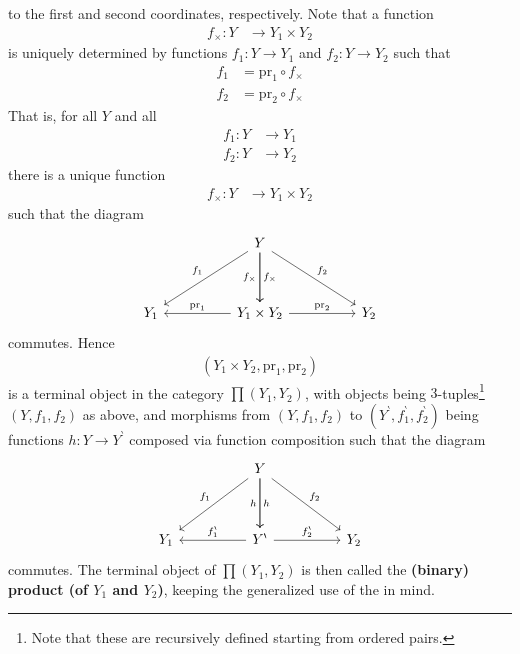 to the first and second coordinates, respectively.
Note that a function
\begin{align*}
  f_{\times}
  \colon
  Y
  &\rightarrow
  Y_{1}
  \times
  Y_{2}
\end{align*}
is uniquely determined by functions $f_{1} \colon Y \rightarrow Y_{1}$ and $f_{2} \colon Y \rightarrow Y_{2}$ such that
\begin{align*}
  f_{1}
  &=
  \mathrm{pr}_{1}
  \circ
  f_{\times}
  \\
  f_{2}
  &=
  \mathrm{pr}_{2}
  \circ
  f_{\times}
\end{align*}
That is, for all $Y$ and all
\begin{align*}
  f_{1}
  \colon
  Y
  &\rightarrow
  Y_{1}
  \\
  f_{2}
  \colon
  Y
  &\rightarrow
  Y_{2}
\end{align*}
there is a unique function
\begin{align*}
  f_{\times}
  \colon
  Y
  &\rightarrow
  Y_{1}
  \times
  Y_{2}
\end{align*}
such that the diagram
\[
\begin{tikzcd}[sep=huge]
  &
  Y
  \arrow{dr}{f_{2}}
  \arrow{d}{f_{\times}}
  \arrow[swap]{d}{f_{\times}}
  \arrow[swap]{dl}{f_{1}}
  &
  \\
  Y_{1}
  &
  Y_{1}
  \times
  Y_{2}
  \arrow{r}{\mathrm{pr}_{2}}
  \arrow[swap]{l}{\mathrm{pr}_{1}}
  &
  Y_{2}
\end{tikzcd}
\]
commutes.
Hence
\begin{align*}
  \left(
    Y_{1}
    \times
    Y_{2},
    \mathrm{pr}_{1},
    \mathrm{pr}_{2}
  \right)
\end{align*}
is a terminal object in the category $\pmb{\prod}(Y_{1},Y_{2})$, with objects being $3$-tuples\footnote{Note that these are recursively defined starting from ordered pairs.} $(Y,f_{1},f_{2})$ as above, and morphisms from $(Y,f_{1},f_{2})$ to $(Y^{\backprime},f_{1}^{\backprime},f_{2}^{\backprime})$ being functions $h \colon Y \rightarrow Y^{\backprime}$ composed via function composition such that the diagram
\[
\begin{tikzcd}[sep=huge]
  &
  Y
  \arrow{dr}{f_{2}}
  \arrow{d}{h}
  \arrow[swap]{d}{h}
  \arrow[swap]{dl}{f_{1}}
  &
  \\
  Y_{1}
  &
  Y^{\backprime}
  \arrow{r}{f_{2}^{\backprime}}
  \arrow[swap]{l}{f_{1}^{\backprime}}
  &
  Y_{2}
\end{tikzcd}
\]
commutes.
The terminal object of $\pmb{\prod}(Y_{1},Y_{2})$ is then called the \textbf{(binary) product (of $Y_{1}$ and $Y_{2}$)}, keeping the generalized use of {\glqq}the{\grqq} in mind.
